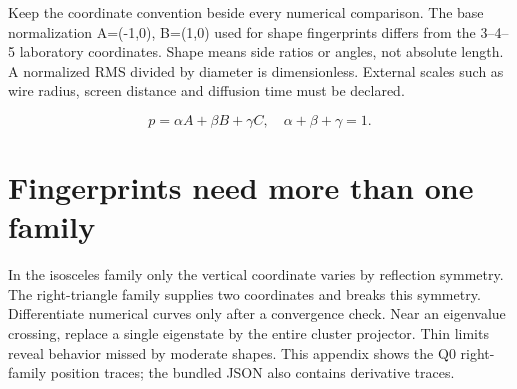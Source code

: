 \documentclass[11pt,oneside,openany]{book}
\begin{document}
Keep the coordinate convention beside every numerical comparison. The base normalization A=(-1,0), B=(1,0) used for shape fingerprints differs from the 3--4--5 laboratory coordinates. Shape means side ratios or angles, not absolute length. A normalized RMS divided by diameter is dimensionless. External scales such as wire radius, screen distance and diffusion time must be declared.


\[p=\alpha A+\beta B+\gamma C,\quad\alpha+\beta+\gamma=1.\]


\section{Fingerprints need more than one family}\label{sec:slide92}

In the isosceles family only the vertical coordinate varies by reflection symmetry. The right-triangle family supplies two coordinates and breaks this symmetry. Differentiate numerical curves only after a convergence check. Near an eigenvalue crossing, replace a single eigenstate by the entire cluster projector. Thin limits reveal behavior missed by moderate shapes. This appendix shows the $\mathrm{Q0}$ right-family position traces; the bundled JSON also contains derivative traces.
\end{document}
